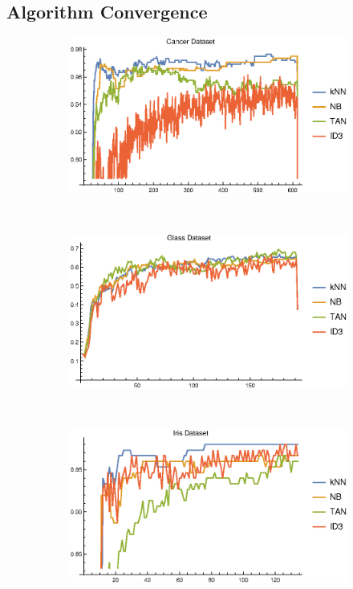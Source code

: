 \documentclass{article}
\begin{document}
	\subsection{Algorithm Convergence}
		\label{conv}
		\begin{figure}[h]
			\centering
			\begin{subfigure}[b]{0.49\textwidth}
				\centering
				\includegraphics[width=\textwidth]{figs/plot_conv_cancer}					
			\end{subfigure}	\	
			\begin{subfigure}[b]{0.49\textwidth}
				\centering
				\includegraphics[width=\textwidth]{figs/plot_conv_glass}					
			\end{subfigure} \	
			\begin{subfigure}[b]{0.49\textwidth}
				\centering
				\includegraphics[width=\textwidth]{figs/plot_conv_iris}					

\end{subfigure}
\end{figure}
\end{document}
